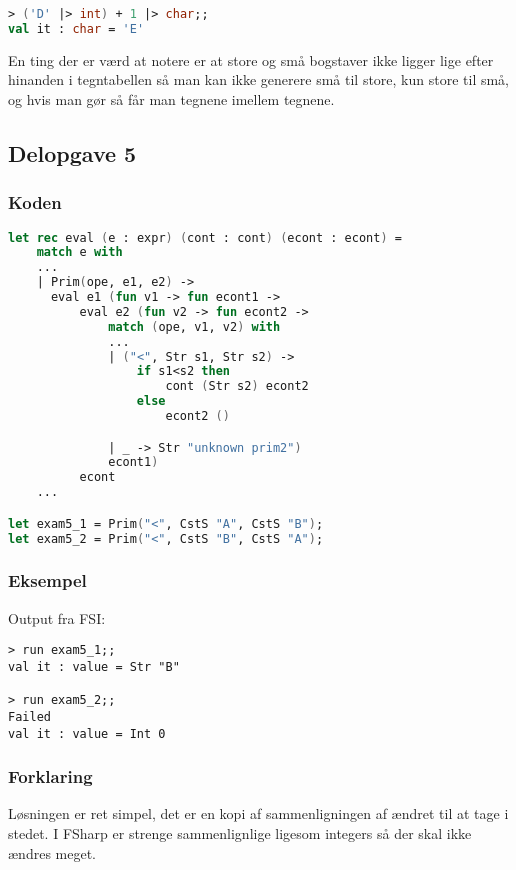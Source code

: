 \begin{lstlisting}[language=fsharp]
> ('D' |> int) + 1 |> char;;
val it : char = 'E'
\end{lstlisting}

En ting der er værd at notere er at store og små bogstaver ikke ligger lige efter hinanden i tegntabellen så man kan ikke generere små til store, kun store til små, og hvis man gør så får man tegnene  imellem tegnene.


\subsection{Delopgave 5}\label{ass:1-5}
\subsubsection{Koden}
\begin{lstlisting}[language=fsharp]
let rec eval (e : expr) (cont : cont) (econt : econt) = 
    match e with
    ...
    | Prim(ope, e1, e2) -> 
      eval e1 (fun v1 -> fun econt1 ->
          eval e2 (fun v2 -> fun econt2 -> 
              match (ope, v1, v2) with
              ...
              | ("<", Str s1, Str s2) -> 
                  if s1<s2 then 
                      cont (Str s2) econt2
                  else
                      econt2 ()

              | _ -> Str "unknown prim2")
              econt1)
          econt
    ...

let exam5_1 = Prim("<", CstS "A", CstS "B");
let exam5_2 = Prim("<", CstS "B", CstS "A");
\end{lstlisting}

\subsubsection{Eksempel}
Output fra FSI:
\begin{lstlisting}
> run exam5_1;;
val it : value = Str "B"

> run exam5_2;;
Failed
val it : value = Int 0
\end{lstlisting}

\subsubsection{Forklaring}
Løsningen er ret simpel, det er en kopi af sammenligningen af  ændret til at tage  i stedet. I FSharp er strenge sammenlignlige ligesom integers så der skal ikke ændres meget.

